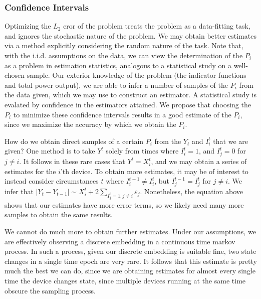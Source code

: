 \documentclass{article}
\begin{document}
\subsubsection{Confidence Intervals}

Optimizing the $L_2$ eror of the problem treats the problem as a data-fitting task, and ignores the stochastic nature of the problem. We may obtain better estimates via a method explicitly considering the random nature of the task. Note that, with the i.i.d. assumptions on the data, we can view the determination of the $P_i$ as a problem in estimation statistics, analogous to a statistical study on a well-chosen sample. Our exterior knowledge of the problem (the indicator functions and total power output), we are able to infer a number of samples of the $P_i$ from the data given, which we may use to construct an estimator. A statistical study is evalated by confidence in the estimators attained. We propose that choosing the $P_i$ to minimize these confidence intervals results in a good estimate of the $P_i$, since we maximize the accuracy by which we obtain the $P_i$.

How do we obtain direct samples of a certain $P_i$ from the $Y_t$ and $I_i^t$ that we are given? One method is to take $Y^t$ solely from times where $I_i^t = 1$, and $I_j^t = 0$ for $j \neq i$. It follows in these rare cases that $Y^t = X_i^t$, and we may obtain a series of estimates for the $i$'th device. To obtain more estimates, it may be of interest to instead consider circumstances $t$ where $I_i^{t-1} \neq I_i^t$, but $I_j^{t-1} = I_j^t$ for $j \neq i$. We infer that $|Y_t - Y_{t-1}| \sim X_i^t + 2 \sum_{I_j^t = 1, j \neq i} \varepsilon_j$. Nonetheless, the equation above shows that our estimates have more error terms, so we likely need many more samples to obtain the same results.

We cannot do much more to obtain further estimates. Under our assumptions, we are effectively observing a discrete embedding in a continuous time markov process. In such a process, given our discrete embedding is suitable fine, two state changes in a single time epoch are very rare. It follows that this estimate is pretty much the best we can do, since we are obtaining estimates for almost every single time the device changes state, since multiple devices running at the same time obscure the sampling process.
\end{document}
